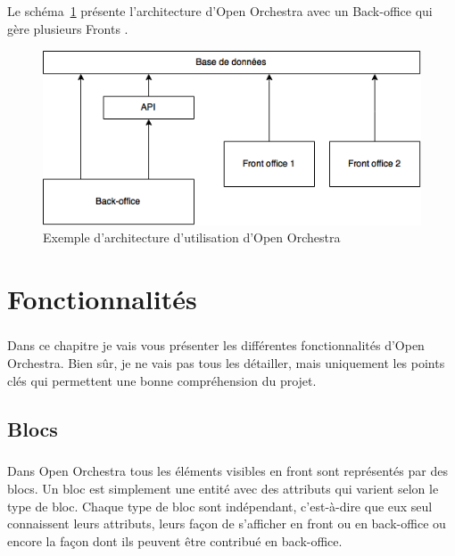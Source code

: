 	    \paragraph{}	
		Le schéma~\ref{architecture} présente l'architecture d'Open Orchestra avec un \og Back-office \fg{} qui gère plusieurs \og Fronts \fg{}.
		\begin{figure}[H]
        \begin{center}
          \includegraphics[scale=1]{images/architecture_open_orchestra}
        \end{center}
        \caption{Exemple d'architecture d'utilisation d'Open Orchestra}
        \label{architecture}
      \end{figure}

   
\chapter{Fonctionnalités}
	    \paragraph{}
	    Dans ce chapitre je vais vous présenter les différentes fonctionnalités d'Open Orchestra. Bien sûr, je ne vais pas tous les détailler, mais uniquement les points clés qui permettent une bonne compréhension du projet.
	      \section{Blocs}
	        \label{Blocs}  
	       \paragraph{}
	      Dans Open Orchestra tous les éléments visibles en front sont représentés par des blocs. Un bloc est simplement une entité avec des attributs qui varient selon le type de bloc. Chaque type de bloc sont indépendant, c'est-à-dire que eux seul connaissent leurs attributs, leurs façon de s'afficher en front ou en back-office ou encore la façon dont ils peuvent être contribué en back-office. 
